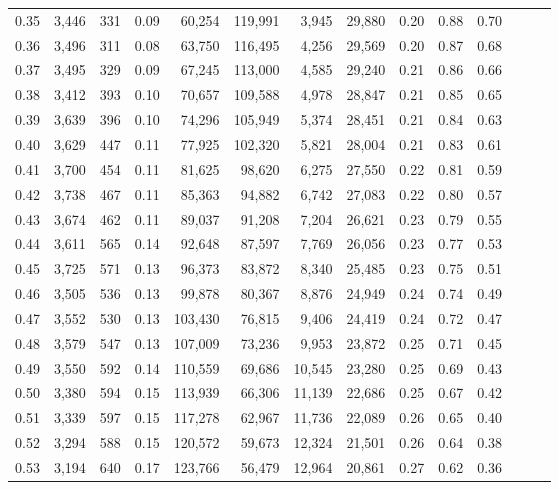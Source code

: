 \begin{tabular}{rrrrrrrrrrrrrr}
0.35 &  3,446 &  331 &  0.09 &   60,254 &  119,991 &   3,945 &  29,880 &  0.20 &  0.88 &      0.70 \\
0.36 &  3,496 &  311 &  0.08 &   63,750 &  116,495 &   4,256 &  29,569 &  0.20 &  0.87 &      0.68 \\
0.37 &  3,495 &  329 &  0.09 &   67,245 &  113,000 &   4,585 &  29,240 &  0.21 &  0.86 &      0.66 \\
0.38 &  3,412 &  393 &  0.10 &   70,657 &  109,588 &   4,978 &  28,847 &  0.21 &  0.85 &      0.65 \\
0.39 &  3,639 &  396 &  0.10 &   74,296 &  105,949 &   5,374 &  28,451 &  0.21 &  0.84 &      0.63 \\
0.40 &  3,629 &  447 &  0.11 &   77,925 &  102,320 &   5,821 &  28,004 &  0.21 &  0.83 &      0.61 \\
0.41 &  3,700 &  454 &  0.11 &   81,625 &   98,620 &   6,275 &  27,550 &  0.22 &  0.81 &      0.59 \\
0.42 &  3,738 &  467 &  0.11 &   85,363 &   94,882 &   6,742 &  27,083 &  0.22 &  0.80 &      0.57 \\
0.43 &  3,674 &  462 &  0.11 &   89,037 &   91,208 &   7,204 &  26,621 &  0.23 &  0.79 &      0.55 \\
0.44 &  3,611 &  565 &  0.14 &   92,648 &   87,597 &   7,769 &  26,056 &  0.23 &  0.77 &      0.53 \\
0.45 &  3,725 &  571 &  0.13 &   96,373 &   83,872 &   8,340 &  25,485 &  0.23 &  0.75 &      0.51 \\
0.46 &  3,505 &  536 &  0.13 &   99,878 &   80,367 &   8,876 &  24,949 &  0.24 &  0.74 &      0.49 \\
0.47 &  3,552 &  530 &  0.13 &  103,430 &   76,815 &   9,406 &  24,419 &  0.24 &  0.72 &      0.47 \\
0.48 &  3,579 &  547 &  0.13 &  107,009 &   73,236 &   9,953 &  23,872 &  0.25 &  0.71 &      0.45 \\
0.49 &  3,550 &  592 &  0.14 &  110,559 &   69,686 &  10,545 &  23,280 &  0.25 &  0.69 &      0.43 \\
0.50 &  3,380 &  594 &  0.15 &  113,939 &   66,306 &  11,139 &  22,686 &  0.25 &  0.67 &      0.42 \\
0.51 &  3,339 &  597 &  0.15 &  117,278 &   62,967 &  11,736 &  22,089 &  0.26 &  0.65 &      0.40 \\
0.52 &  3,294 &  588 &  0.15 &  120,572 &   59,673 &  12,324 &  21,501 &  0.26 &  0.64 &      0.38 \\
0.53 &  3,194 &  640 &  0.17 &  123,766 &   56,479 &  12,964 &  20,861 &  0.27 &  0.62 &      0.36 \\

\end{tabular}
